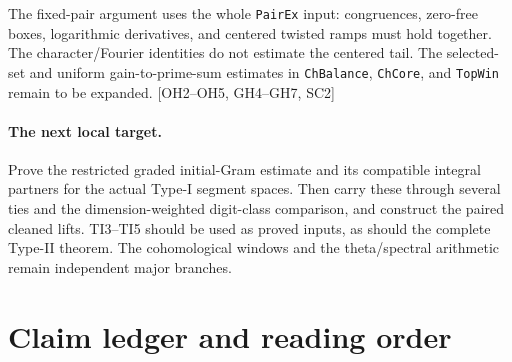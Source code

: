 \documentclass[11pt,a4paper]{article}
\numberwithin{equation}{section}
\theoremstyle{remark}\newtheorem{remark}[theorem]{Remark}
\begin{document}
\begin{description}[style=nextline]
\item[Simultaneous prime selection and the centered target.]
The fixed-pair argument uses the whole \texttt{PairEx} input: congruences, zero-free boxes, logarithmic derivatives, and centered twisted ramps must hold together. The character/Fourier identities do not estimate the centered tail. The selected-set and uniform gain-to-prime-sum estimates in \texttt{ChBalance}, \texttt{ChCore}, and \texttt{TopWin} remain to be expanded. \textsf{[OH2--OH5, GH4--GH7, SC2]}
\end{description}

\paragraph{The next local target.}
Prove the restricted graded initial-Gram estimate and its compatible
integral partners for the actual Type-I segment spaces. Then carry these
through several ties and the dimension-weighted digit-class comparison,
and construct the paired cleaned lifts. TI3--TI5 should be used as proved
inputs, as should the complete Type-II theorem. The cohomological windows
and the theta/spectral arithmetic remain independent major branches.

\section{Claim ledger and reading order}
\end{document}
